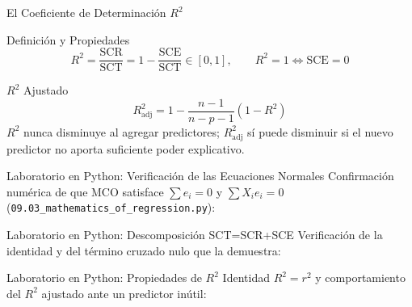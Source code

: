 \documentclass[10pt, aspectratio=169]{beamer}
\begin{document}
\begin{frame}{El Coeficiente de Determinación $R^2$}
  \footnotesize
  \begin{block}{Definición y Propiedades}
    $$R^2=\frac{\text{SCR}}{\text{SCT}}=1-\frac{\text{SCE}}{\text{SCT}} \in[0,1], \qquad R^2=1 \iff \text{SCE}=0$$
  \end{block}
  \pause

  \vspace{0.1cm}
  \begin{alertblock}{$R^2$ Ajustado}
    $$R^2_{\text{adj}}=1-\frac{n-1}{n-p-1}(1-R^2)$$
    $R^2$ nunca disminuye al agregar predictores; $R^2_{\text{adj}}$ sí puede disminuir si el nuevo predictor no aporta suficiente poder explicativo.
  \end{alertblock}
\end{frame}

\begin{frame}[fragile]{Laboratorio en Python: Verificación de las Ecuaciones Normales}
  \scriptsize
  Confirmación numérica de que MCO satisface $\sum e_i=0$ y $\sum X_ie_i=0$ (\texttt{09.03\_mathematics\_of\_regression.py}):
  {
  }
\end{frame}

\begin{frame}[fragile]{Laboratorio en Python: Descomposición SCT=SCR+SCE}
  \scriptsize
  Verificación de la identidad y del término cruzado nulo que la demuestra:
  {
  }
\end{frame}

\begin{frame}[fragile]{Laboratorio en Python: Propiedades de $R^2$}
  \scriptsize
  Identidad $R^2=r^2$ y comportamiento del $R^2$ ajustado ante un predictor inútil:
  {
  }
\end{frame}
\end{document}
